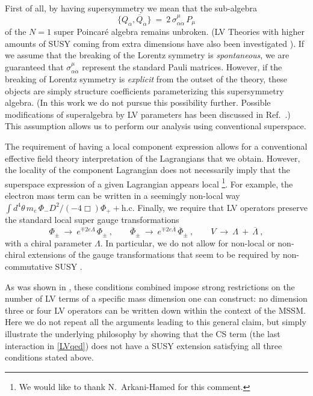 \documentclass[12pt]{revtex4}
\begin{document}
First of all,
by having supersymmetry we mean that the sub-algebra 
%
\begin{equation}
\{ Q_\alpha, \overline{Q}_{\dot\alpha} \} ~=~ 
2\, \sigma^\mu_{\alpha\dot{\alpha}} \, P_\mu
\end{equation}
%
of the $N=1$ super Poincar\'e algebra remains unbroken. (LV Theories with
higher amounts of SUSY coming from extra dimensions have also
been investigated  \cite{Ney:2004tn,Ney:2005gb,Ney:2005wc}).
If we assume that the breaking of the Lorentz symmetry is 
{\em spontaneous}, we are guaranteed that
$\sigma^\mu_{\alpha\dot{\alpha}}$ represent the standard Pauli
matrices. However, if the breaking of Lorentz symmetry is {\em
explicit} from the outset of the theory, these objects are simply 
structure coefficients parameterizing this supersymmetry algebra. (In
this work we do not pursue this possibility further. Possible
modifications of superalgebra by LV parameters has been discussed in
Ref.~\cite{Berger:,Berger:2003ay}.) This assumption allows us to perform our
analysis using conventional superspace.  


The requirement of having a local component expression allows for a
conventional effective field theory interpretation of the Lagrangians that
we obtain. However, the locality of the component Lagrangian
does not necessarily imply that the superspace
expression of a given Lagrangian appears local 
\footnote{We would like to thank N.\ Arkani-Hamed for this comment.}. 
For example, the electron mass term can be written in a seemingly
non-local way 
%
\(
\int d^4 \theta\, m_e \, \Phi_- D^2/(- 4\Box) \Phi_+ + \text{h.c.}
\)
%
Finally, we require that LV operators preserve the standard local
super gauge transformations  
%
\begin{equation}
\Phi_\pm ~\rightarrow~ e^{\mp 2 e \Lambda} \, \Phi_\pm~, 
\qquad 
\overline{\Phi}_\pm ~\rightarrow~ e^{\mp 2 e \overline{\Lambda}} \, 
\overline{\Phi}_\pm~, 
\qquad 
V ~\rightarrow~ \Lambda ~+~ \overline{\Lambda}~, 
\label{Gauge}
\end{equation} 
%
with a chiral parameter $\Lambda$. In particular, we do not allow for
non-local or non-chiral extensions of the gauge transformations that
seem to be required by non-commutative SUSY
\cite{Putz:2002ib,Mikulovic:2003sq}.  


As was shown in \cite{GrootNibbelink:2004za}, these conditions 
combined impose strong restrictions on the number of LV terms of
a specific mass dimension one can construct: no dimension three or four
LV operators can be written down within the context of the MSSM. 
Here we do not repeat all the arguments leading to this general claim,
but simply illustrate the underlying philosophy by showing that the CS
term (the last interaction in \eqref{LVqed}) does not have a SUSY
extension satisfying all three conditions stated above. 
\end{document}
